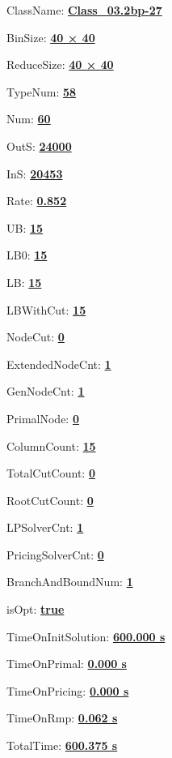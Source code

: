 \documentclass[11pt]{article}
\begin{document}
\pagestyle{empty}


ClassName: \underline{\textbf{Class_03.2bp-27}}
\par
BinSize: \underline{\textbf{40 × 40}}
\par
ReduceSize: \underline{\textbf{40 × 40}}
\par
TypeNum: \underline{\textbf{58}}
\par
Num: \underline{\textbf{60}}
\par
OutS: \underline{\textbf{24000}}
\par
InS: \underline{\textbf{20453}}
\par
Rate: \underline{\textbf{0.852}}
\par
UB: \underline{\textbf{15}}
\par
LB0: \underline{\textbf{15}}
\par
LB: \underline{\textbf{15}}
\par
LBWithCut: \underline{\textbf{15}}
\par
NodeCut: \underline{\textbf{0}}
\par
ExtendedNodeCnt: \underline{\textbf{1}}
\par
GenNodeCnt: \underline{\textbf{1}}
\par
PrimalNode: \underline{\textbf{0}}
\par
ColumnCount: \underline{\textbf{15}}
\par
TotalCutCount: \underline{\textbf{0}}
\par
RootCutCount: \underline{\textbf{0}}
\par
LPSolverCnt: \underline{\textbf{1}}
\par
PricingSolverCnt: \underline{\textbf{0}}
\par
BranchAndBoundNum: \underline{\textbf{1}}
\par
isOpt: \underline{\textbf{true}}
\par
TimeOnInitSolution: \underline{\textbf{600.000 s}}
\par
TimeOnPrimal: \underline{\textbf{0.000 s}}
\par
TimeOnPricing: \underline{\textbf{0.000 s}}
\par
TimeOnRmp: \underline{\textbf{0.062 s}}
\par
TotalTime: \underline{\textbf{600.375 s}}
\par
\newpage


\end{document}
